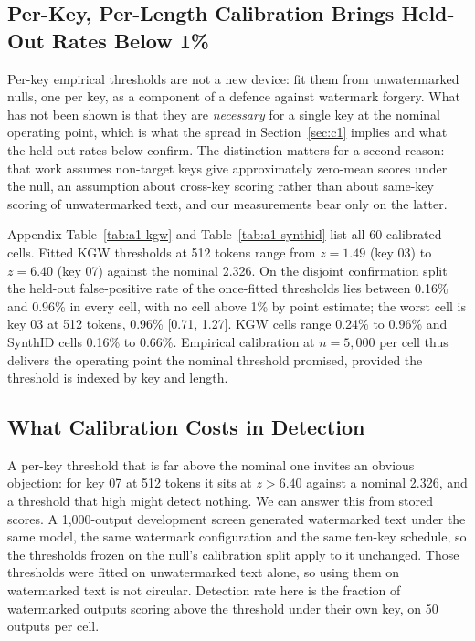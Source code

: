 \documentclass[conference]{IEEEtran}
\begin{document}
\subsection{Per-Key, Per-Length Calibration Brings Held-Out Rates Below 1\%}
\label{sec:c4}

Per-key empirical thresholds are not a new device: \citet{aremu2025forgery} fit
them from unwatermarked nulls, one per key, as a component of a defence against
watermark forgery. What has not been shown is that they are \emph{necessary} for a
single key at the nominal operating point, which is what the spread in
Section~\ref{sec:c1} implies and what the held-out rates below confirm. The
distinction matters for a second reason: that work assumes non-target keys give
approximately zero-mean scores under the null, an assumption about cross-key
scoring rather than about same-key scoring of unwatermarked text, and our
measurements bear only on the latter.

Appendix Table~\ref{tab:a1-kgw} and Table~\ref{tab:a1-synthid} list all 60
calibrated cells. Fitted KGW thresholds at 512 tokens range from $z=1.49$ (key 03)
to $z=6.40$ (key 07) against the nominal 2.326. On the disjoint confirmation split
the held-out false-positive rate of the once-fitted thresholds lies between 0.16\%
and 0.96\% in every cell, with no cell above 1\% by point estimate; the worst cell
is key 03 at 512 tokens, 0.96\% [0.71, 1.27]. KGW cells range 0.24\% to 0.96\% and
SynthID cells 0.16\% to 0.66\%. Empirical calibration at $n=5{,}000$ per cell thus
delivers the operating point the nominal threshold promised, provided the
threshold is indexed by key and length.

\subsection{What Calibration Costs in Detection}
\label{sec:c4b}

A per-key threshold that is far above the nominal one invites an obvious
objection: for key 07 at 512 tokens it sits at $z>6.40$ against a nominal
2.326, and a threshold that high might detect nothing. We can answer this from
stored scores. A 1{,}000-output development screen generated watermarked text
under the same model, the same watermark configuration and the same ten-key
schedule, so the thresholds frozen on the null's calibration split apply to it
unchanged. Those thresholds were fitted on unwatermarked text alone, so using
them on watermarked text is not circular. Detection rate here is the fraction of
watermarked outputs scoring above the threshold under their own key, on 50
outputs per cell.
\end{document}
